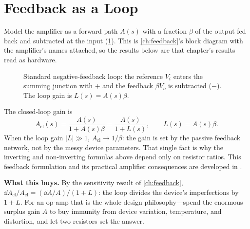 \section{Feedback as a Loop}
Model the amplifier as a forward path \(A(s)\) with a fraction \(\beta\) of the
output fed back and subtracted at the input (\cref{fig:feedback-loop}). This is
\cref{ch:feedback}'s block diagram with the amplifier's names attached, so the
results below are that chapter's results read as hardware.

\begin{figure}[htbp]
\centering
{}
\caption{Standard negative-feedback loop: the reference \(V_i\) enters the summing
junction with \(+\) and the feedback \(\beta V_o\) is subtracted (\(-\)). The loop
gain is \(L(s)=A(s)\beta\).}
\label{fig:feedback-loop}
\end{figure}

The closed-loop gain is
\[
A_{\text{cl}}(s)=\frac{A(s)}{1+A(s)\beta}
=\frac{A(s)}{1+L(s)},
\qquad
L(s)=A(s)\beta .
\]
When the loop gain \(|L|\gg1\), \(A_{\text{cl}}\to 1/\beta\): the gain is set by
the passive feedback network, not by the messy device parameters. That single
fact is why the inverting and non-inverting formulas above depend only on
resistor ratios.
This feedback formulation and its practical amplifier consequences are developed in
\cite[pp.~177--203]{davis2011rfcircuit}.

\begin{controlsbox}
\textbf{What this buys.} By the sensitivity result of \cref{ch:feedback},
\(\dd A_{\text{cl}}/A_{\text{cl}}=(\dd A/A)/(1+L)\): the loop divides the device's
imperfections by \(1+L\). For an op-amp that is the whole design philosophy---spend
the enormous surplus gain \(A\) to buy immunity from device variation, temperature,
and distortion, and let two resistors set the answer.
\end{controlsbox}

